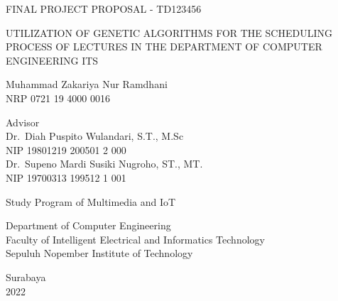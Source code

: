 \begin{large}
  FINAL PROJECT PROPOSAL - TD123456
\end{large}

\vspace{\fill}

\begin{spacing}{1.5}
  \begin{Large}
    UTILIZATION OF GENETIC ALGORITHMS FOR THE 
    SCHEDULING PROCESS OF LECTURES IN THE 
    DEPARTMENT OF COMPUTER ENGINEERING ITS
  \end{Large}
\end{spacing}

\vspace{\fill}

\begin{large}
  Muhammad Zakariya Nur Ramdhani \\
  \textmd{NRP 0721 19 4000 0016}
\end{large}

\vspace{\fill}

\begin{large}
  \textmd{Advisor} \\
  Dr.\ Diah Puspito Wulandari, S.T., M.Sc\\
  \textmd{NIP 19801219 200501 2 000} \\
  Dr.\ Supeno Mardi Susiki Nugroho, ST., MT. \\
  \textmd{NIP 19700313 199512 1 001}
\end{large}

\vspace{\fill}

Study Program of Multimedia and IoT \\

\mdseries

Department of Computer Engineering \\
Faculty of Intelligent Electrical and Informatics Technology\\
Sepuluh Nopember Institute of Technology

Surabaya \\
2022

